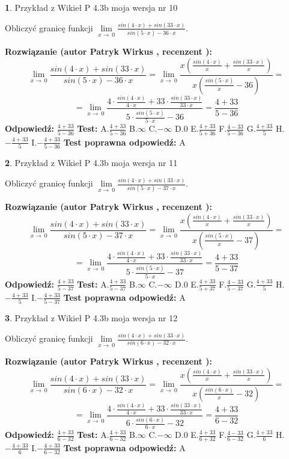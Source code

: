 \documentclass[12pt, a4paper]{article}
\theoremstyle{definition} %
\newtheorem{zad}{}
\newcommand{\zadStart}[1]{\begin{zad}#1\newline}
\newcommand{\zadStop}{\end{zad}}
\newcommand{\rozwStart}[2]{\noindent \textbf{Rozwiązanie (autor #1 , recenzent #2): }\newline}
\newcommand{\rozwStop}{\newline}
\newcommand{\odpStart}{\noindent \textbf{Odpowiedź:}\newline}
\newcommand{\odpStop}{\newline}
\newcommand{\testStart}{\noindent \textbf{Test:}\newline}
\newcommand{\testStop}{\newline}
\newcommand{\kluczStart}{\noindent \textbf{Test poprawna odpowiedź:}\newline}
\newcommand{\kluczStop}{\newline}
\begin{document}
\zadStart{Przykład z Wikieł P 4.3b moja wersja nr 10}


Obliczyć granicę funkcji $\lim\limits_{x\to\ 0}\frac{sin(4 \cdot x)+sin(33 \cdot x)}{sin(5 \cdot x)-36 \cdot x}$.
\zadStop
\rozwStart{Patryk Wirkus}{}
$$\lim\limits_{x\to\ 0}\frac{sin(4 \cdot x)+sin(33 \cdot x)}{sin(5 \cdot x)-36 \cdot x}=\lim\limits_{x\to\ 0}\frac{x(\frac{sin(4 \cdot x)}{x}+\frac{sin(33 \cdot x)}{x})}{x(\frac{sin(5 \cdot x)}{x}-36)}=$$
$$=\lim\limits_{x\to\ 0}\frac{4 \cdot \frac{sin(4 \cdot x)}{4 \cdot x}+33 \cdot \frac{sin(33 \cdot x)}{33 \cdot x}}{5 \cdot \frac{sin(5 \cdot x)}{5 \cdot x}-36}=\frac{4+33}{5-36}$$
\rozwStop
\odpStart
$\frac{4+33}{5-36}$
\odpStop
\testStart
A.$\frac{4+33}{5-36}$
B.$\infty$
C.$-\infty$
D.$0$
E.$\frac{4+33}{5+36}$
F.$\frac{4-33}{5-36}$
G.$\frac{4+33}{5}$
H.$-\frac{4+33}{5}$
I.$-\frac{4+33}{5-36}$
\testStop
\kluczStart
A
\kluczStop



\zadStart{Przykład z Wikieł P 4.3b moja wersja nr 11}


Obliczyć granicę funkcji $\lim\limits_{x\to\ 0}\frac{sin(4 \cdot x)+sin(33 \cdot x)}{sin(5 \cdot x)-37 \cdot x}$.
\zadStop
\rozwStart{Patryk Wirkus}{}
$$\lim\limits_{x\to\ 0}\frac{sin(4 \cdot x)+sin(33 \cdot x)}{sin(5 \cdot x)-37 \cdot x}=\lim\limits_{x\to\ 0}\frac{x(\frac{sin(4 \cdot x)}{x}+\frac{sin(33 \cdot x)}{x})}{x(\frac{sin(5 \cdot x)}{x}-37)}=$$
$$=\lim\limits_{x\to\ 0}\frac{4 \cdot \frac{sin(4 \cdot x)}{4 \cdot x}+33 \cdot \frac{sin(33 \cdot x)}{33 \cdot x}}{5 \cdot \frac{sin(5 \cdot x)}{5 \cdot x}-37}=\frac{4+33}{5-37}$$
\rozwStop
\odpStart
$\frac{4+33}{5-37}$
\odpStop
\testStart
A.$\frac{4+33}{5-37}$
B.$\infty$
C.$-\infty$
D.$0$
E.$\frac{4+33}{5+37}$
F.$\frac{4-33}{5-37}$
G.$\frac{4+33}{5}$
H.$-\frac{4+33}{5}$
I.$-\frac{4+33}{5-37}$
\testStop
\kluczStart
A
\kluczStop



\zadStart{Przykład z Wikieł P 4.3b moja wersja nr 12}


Obliczyć granicę funkcji $\lim\limits_{x\to\ 0}\frac{sin(4 \cdot x)+sin(33 \cdot x)}{sin(6 \cdot x)-32 \cdot x}$.
\zadStop
\rozwStart{Patryk Wirkus}{}
$$\lim\limits_{x\to\ 0}\frac{sin(4 \cdot x)+sin(33 \cdot x)}{sin(6 \cdot x)-32 \cdot x}=\lim\limits_{x\to\ 0}\frac{x(\frac{sin(4 \cdot x)}{x}+\frac{sin(33 \cdot x)}{x})}{x(\frac{sin(6 \cdot x)}{x}-32)}=$$
$$=\lim\limits_{x\to\ 0}\frac{4 \cdot \frac{sin(4 \cdot x)}{4 \cdot x}+33 \cdot \frac{sin(33 \cdot x)}{33 \cdot x}}{6 \cdot \frac{sin(6 \cdot x)}{6 \cdot x}-32}=\frac{4+33}{6-32}$$
\rozwStop
\odpStart
$\frac{4+33}{6-32}$
\odpStop
\testStart
A.$\frac{4+33}{6-32}$
B.$\infty$
C.$-\infty$
D.$0$
E.$\frac{4+33}{6+32}$
F.$\frac{4-33}{6-32}$
G.$\frac{4+33}{6}$
H.$-\frac{4+33}{6}$
I.$-\frac{4+33}{6-32}$
\testStop
\kluczStart
A
\kluczStop
\end{document}
